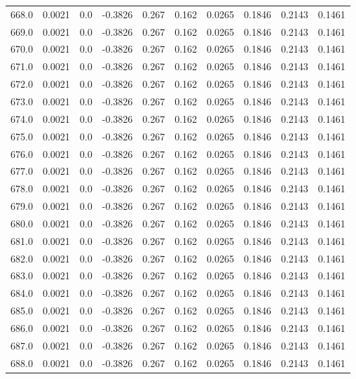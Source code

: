 \begin{longtable}{lrrrrrrrrr}
668.0 & 0.0021 & 0.0 & -0.3826 & 0.267 & 0.162 & 0.0265 & 0.1846 & 0.2143 & 0.1461 \\
669.0 & 0.0021 & 0.0 & -0.3826 & 0.267 & 0.162 & 0.0265 & 0.1846 & 0.2143 & 0.1461 \\
670.0 & 0.0021 & 0.0 & -0.3826 & 0.267 & 0.162 & 0.0265 & 0.1846 & 0.2143 & 0.1461 \\
671.0 & 0.0021 & 0.0 & -0.3826 & 0.267 & 0.162 & 0.0265 & 0.1846 & 0.2143 & 0.1461 \\
672.0 & 0.0021 & 0.0 & -0.3826 & 0.267 & 0.162 & 0.0265 & 0.1846 & 0.2143 & 0.1461 \\
673.0 & 0.0021 & 0.0 & -0.3826 & 0.267 & 0.162 & 0.0265 & 0.1846 & 0.2143 & 0.1461 \\
674.0 & 0.0021 & 0.0 & -0.3826 & 0.267 & 0.162 & 0.0265 & 0.1846 & 0.2143 & 0.1461 \\
675.0 & 0.0021 & 0.0 & -0.3826 & 0.267 & 0.162 & 0.0265 & 0.1846 & 0.2143 & 0.1461 \\
676.0 & 0.0021 & 0.0 & -0.3826 & 0.267 & 0.162 & 0.0265 & 0.1846 & 0.2143 & 0.1461 \\
677.0 & 0.0021 & 0.0 & -0.3826 & 0.267 & 0.162 & 0.0265 & 0.1846 & 0.2143 & 0.1461 \\
678.0 & 0.0021 & 0.0 & -0.3826 & 0.267 & 0.162 & 0.0265 & 0.1846 & 0.2143 & 0.1461 \\
679.0 & 0.0021 & 0.0 & -0.3826 & 0.267 & 0.162 & 0.0265 & 0.1846 & 0.2143 & 0.1461 \\
680.0 & 0.0021 & 0.0 & -0.3826 & 0.267 & 0.162 & 0.0265 & 0.1846 & 0.2143 & 0.1461 \\
681.0 & 0.0021 & 0.0 & -0.3826 & 0.267 & 0.162 & 0.0265 & 0.1846 & 0.2143 & 0.1461 \\
682.0 & 0.0021 & 0.0 & -0.3826 & 0.267 & 0.162 & 0.0265 & 0.1846 & 0.2143 & 0.1461 \\
683.0 & 0.0021 & 0.0 & -0.3826 & 0.267 & 0.162 & 0.0265 & 0.1846 & 0.2143 & 0.1461 \\
684.0 & 0.0021 & 0.0 & -0.3826 & 0.267 & 0.162 & 0.0265 & 0.1846 & 0.2143 & 0.1461 \\
685.0 & 0.0021 & 0.0 & -0.3826 & 0.267 & 0.162 & 0.0265 & 0.1846 & 0.2143 & 0.1461 \\
686.0 & 0.0021 & 0.0 & -0.3826 & 0.267 & 0.162 & 0.0265 & 0.1846 & 0.2143 & 0.1461 \\
687.0 & 0.0021 & 0.0 & -0.3826 & 0.267 & 0.162 & 0.0265 & 0.1846 & 0.2143 & 0.1461 \\
688.0 & 0.0021 & 0.0 & -0.3826 & 0.267 & 0.162 & 0.0265 & 0.1846 & 0.2143 & 0.1461 \\

\end{longtable}
